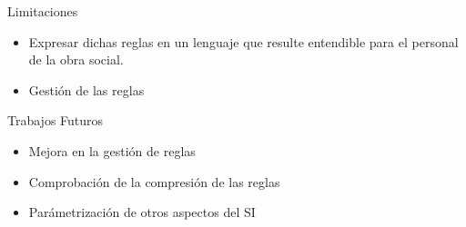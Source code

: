 \documentclass[10pt]{beamer}
\begin{document}
\begin{frame}{Limitaciones}
    \begin{itemize}
        \item Expresar dichas reglas en un lenguaje que resulte entendible para el personal de la obra social.
        \item Gestión de las reglas
    \end{itemize}
\end{frame}

\begin{frame}{Trabajos Futuros}
    \begin{itemize}
        \item Mejora en la gestión de reglas
        \item Comprobación de la compresión de las reglas
        \item Parámetrización de otros aspectos del SI
    \end{itemize}
\end{frame}

\end{document}
